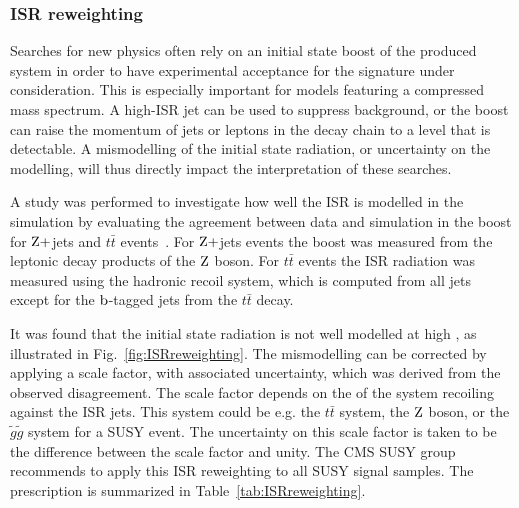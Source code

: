 
% 
% 
% 


\subsubsection{ISR reweighting \label{sec:event_ISRreweighting}}

Searches for new physics often rely on an initial state boost of the produced system in order to
have experimental acceptance for the signature under consideration. This is especially important
for models featuring a compressed mass spectrum. A high-\pt ISR jet can be used to suppress
background, or the boost can raise the momentum of jets or leptons in the decay chain to a level
that is detectable.
A mismodelling of the initial state radiation, or uncertainty on the modelling, will thus
directly impact the interpretation of these searches. 

A study was performed to investigate how well the ISR is
modelled in the simulation by evaluating the agreement between data and simulation in the boost \pt
for $\mathrm{Z}+$jets and $t\bar{t}$ events~\cite{Chatrchyan:2013xna,ISRreweighting}. 
For $\mathrm{Z}+$jets events the boost \pt was measured from the leptonic decay products of the $\mathrm{Z}$
boson. For $t\bar{t}$ events the ISR radiation was measured using the hadronic recoil system, which
is computed from all jets except for the $\mathrm{b}$-tagged jets from the $t\bar{t}$ decay. 

It was found that the initial state radiation is not well modelled at high \pt, as illustrated in
Fig.~\ref{fig:ISRreweighting}. The mismodelling
can be corrected by applying a scale factor, with associated uncertainty, which was derived from the
observed disagreement. The scale factor depends on the \pt of the system recoiling against the ISR
jets. This system could be e.g. the $t\bar{t}$ system, the $\mathrm{Z}$ boson, or the $\tilde{g}\tilde{g}$
system for a SUSY event.  The uncertainty on this scale factor is taken to be the difference
between the scale factor and unity. 
The CMS SUSY group recommends to apply this ISR reweighting to all SUSY signal samples.
The prescription is summarized in Table~\ref{tab:ISRreweighting}. 

